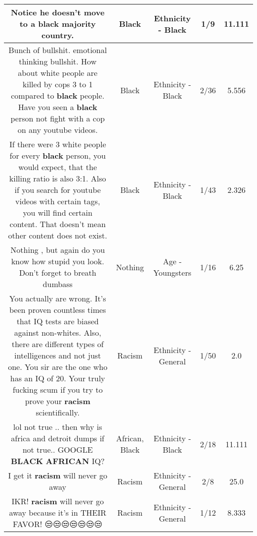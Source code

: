 \documentclass[11pt]{article}
\newlength\mylength
\begin{document}
\begin{center}
\begin{longtable}{|C{.65\mylength}|C{.30\mylength}|C{.12\mylength}|C{.12\mylength}|C{.12\mylength}|}
  \small Notice he doesn't move to a \textbf{black} majority country.\normalsize   & Black & Ethnicity - Black & 1/9 & 11.111 \\  \hline
  \small Bunch of bullshit. emotional thinking bullshit. How about white people are killed by cops 3 to 1 compared to \textbf{black} people. Have you seen a \textbf{black} person not fight with a cop on any youtube videos.\normalsize   & Black & Ethnicity - Black & 2/36 & 5.556 \\  \hline
  \small If there were 3 white people for every \textbf{black} person, you would expect, that the killing ratio is also 3:1. Also if you search for youtube videos with certain tags, you will find certain content. That doesn't mean other content does not exist.\normalsize   & Black & Ethnicity - Black & 1/43 & 2.326 \\  \hline
  \small Nothing , but again do you know how stupid you look. Don't forget to breath dumbass\normalsize   & Nothing & Age - Youngsters & 1/16 & 6.25 \\  \hline
  \small You actually are wrong. It's been proven countless times that IQ tests are biased against non-whites. Also, there are different types of intelligences and not just one. You sir are the one who has an IQ of 20. Your truly fucking scum if you try to prove your \textbf{racism} scientifically.\normalsize   & Racism & Ethnicity - General & 1/50 & 2.0 \\  \hline
  \small lol not true .. then why is africa and detroit dumps if not true.. GOOGLE \textbf{BLACK} \textbf{AFRICAN} IQ?\normalsize   & African, Black & Ethnicity - Black & 2/18 & 11.111 \\  \hline
  \small I get it \textbf{racism} will never go away\normalsize   & Racism & Ethnicity - General & 2/8 & 25.0 \\  \hline
  \small IKR! \textbf{racism} will never go away because it's in THEIR FAVOR! 😒😒😒😒😒😒😒\normalsize   & Racism & Ethnicity - General & 1/12 & 8.333 \\  \hline

\end{longtable}
\end{center}
\end{document}

